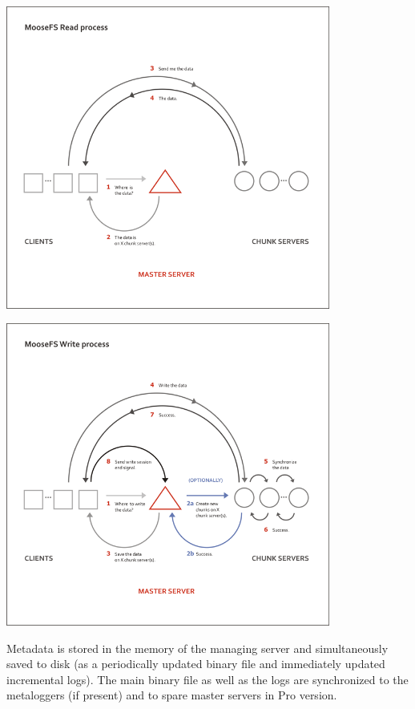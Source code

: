 \documentclass[a4paper,11pt,english]{report}
\begin{document}
		\begin{center}
			\includegraphics[width=0.8\textwidth]{images/read_mfs.png}\\[1cm]
		\end{center}

		\vfill

		\begin{center}
			\includegraphics[width=0.8\textwidth]{images/write_mfs.png}\\[1cm]
		\end{center}
		
		Metadata is stored in the memory of the managing server and simultaneously saved to disk (as a periodically updated binary file and immediately updated incremental logs). The main binary file as well as the logs are synchronized to the metaloggers (if present) and to spare master servers in Pro version.
		
\end{document}
